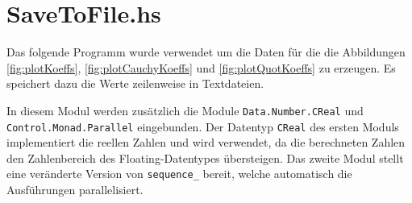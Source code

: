 \begin{comment}
\begin{align*}
v(t)&=
  \frac{1}{2}t^{-1}+
  \frac{3}{4}it^{0}+
  \frac{3}{2}t^{1}+
  \frac{-63}{16}it^{2}+
  \frac{-27}{2}t^{3}+
  \frac{1899}{32}it^{4}+
  \frac{324}{1}t^{5}+
  \frac{-543483}{256}it^{6}+
\\&\qquad\frac{-32427}{2}t^{7}+
  \frac{72251109}{512}it^{8}+
  \frac{2752623}{2}t^{9}+
  \frac{-30413055339}{2048}it^{10}+
  \frac{-175490226}{1}t^{11}+
\\&\qquad\frac{9228545313147}{4096}it^{12}+
  \frac{31217145174}{1}t^{13}+
  \frac{-30419533530730323}{65536}it^{14}+
\\&\qquad\frac{-14741904895227}{2}t^{15}+
  \frac{16317191917079376129}{131072}it^{16}+
  \frac{4456057685561073}{2}t^{17}+
\\&\qquad\frac{-22082325223708363779009}{524288}it^{18}+
  \frac{-1677161966915352627}{2}t^{19}+
\\&\qquad\frac{18391039987731669876160557}{1048576}it^{20}+
  \frac{384452768592440499024}{1}t^{21}+
\\&\qquad\frac{-73930258776609869550094166319}{8388608}it^{22}+
  \frac{-210878717949731493002826}{1}t^{23}+
\\&\qquad\frac{88204980719873920964105544038937}{16777216}it^{24}+
  \frac{136346686011011135869054074}{1}t^{25}+
\\&\qquad\frac{-246474684300724210330466557670749827}{67108864}it^{26}+
\\&\qquad\frac{-102614997677451303311734530276}{1}t^{27}+
\\&\qquad\frac{398608966820777951112056743321778108571}{134217728}it^{28}+
\\&\qquad\frac{88929857099067937229443324337874}{1}t^{29}+
\\&\qquad\frac{-11819876688678190917510659802435441505814403}{4294967296}it^{30}+
  \dots
\end{align*}
\end{comment}

\section{SaveToFile.hs} \label{sec:SaveToFile.hs}
Das folgende Programm wurde verwendet um die Daten für die die Abbildungen
\ref{fig:plotKoeffs}, \ref{fig:plotCauchyKoeffs} und \ref{fig:plotQuotKoeffs}
zu erzeugen. Es speichert dazu die Werte zeilenweise in Textdateien. 

In diesem Modul werden zusätzlich die Module \texttt{Data.Number.CReal} und
\texttt{Control.Monad.Parallel} eingebunden.
Der Datentyp \texttt{CReal} des ersten Moduls implementiert die reellen Zahlen
und wird verwendet, da die berechneten Zahlen den Zahlenbereich des
Floating-Datentypes übersteigen.  Das zweite Modul stellt eine veränderte
Version von \texttt{sequence\_} bereit, welche automatisch die Ausführungen
parallelisiert.


